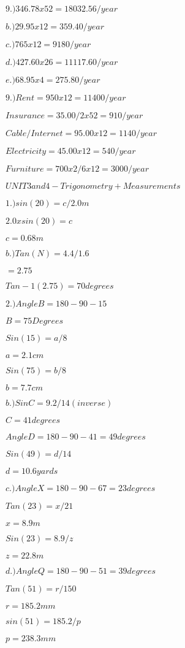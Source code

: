 \documentclass{article}
\begin{document}
\vspace
$9.)346.78x52=18032.56/year$

$b.)29.95x12=359.40/year$

$c.)765x12=9180/year$

$d.)427.60x26=11117.60/year$

$e.)68.95x4=275.80/year$

\vspace
$9.)Rent=950x12=11400/year$

\vspace
$Insurance=35.00/2x52=910/year$

\vspace
$Cable/Internet=95.00x12=1140/year$

\vspace
$Electricity=45.00x12=540/year$

\vspace
$Furniture=700x2/6x12=3000/year$


\vspace
$UNIT 3 and 4 - Trigonometry + Measurements$

\vspace
$1.) sin(20)=c/2.0m$

\vspace
$2.0xsin(20)=c$

\vspace
$c=0.68m$

\vspace
$b.)Tan(N)=4.4/1.6$

\vspace
$=2.75$

\vspace
$Tan-1(2.75)=70 degrees$

\vspace
$2.)Angle B= 180-90-15$

\vspace
$B= 75 Degrees$

\vspace
$Sin(15)=a/8$

\vspace
$a=2.1cm$

\vspace
$Sin(75)=b/8$

\vspace
$b=7.7cm$

\vspace
$b.)SinC=9.2/14(inverse)$

\vspace
$C=41 degrees$

\vspace
$Angle D= 180-90-41= 49 degrees$

\vspace
$Sin(49)=d/14$

\vspace
$d=10.6 yards$

\vspace
$c.)Angle X= 180-90-67=23 degrees$

\vspace
$Tan(23)=x/21$

\vspace
$x=8.9m$

\vspace
$Sin(23)=8.9/z$

\vspace
$z=22.8m$

\vspace
$d.)Angle Q= 180-90-51=39 degrees$

\vspace
$Tan(51)=r/150$

\vspace
$r=185.2mm$

\vspace
$sin(51)=185.2/p$

\vspace
$p=238.3mm$
\end{document}
